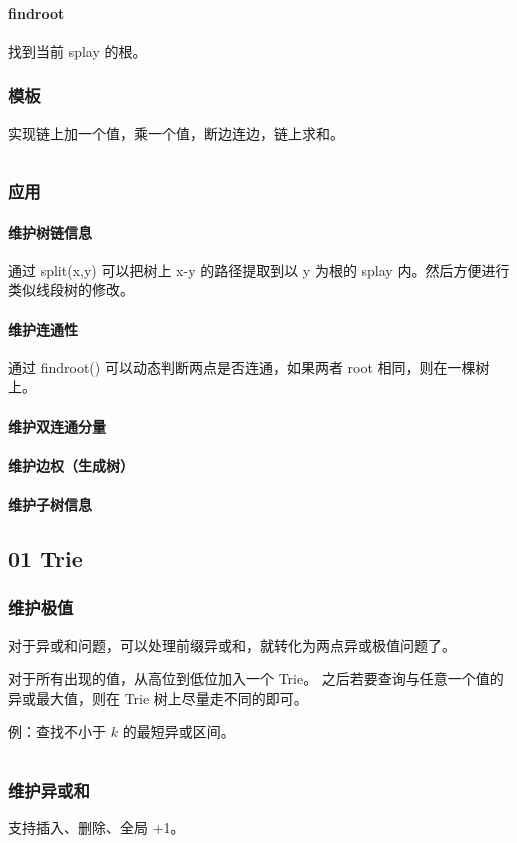 \documentclass[a4paper,11pt]{article}
\begin{document}
\paragraph{findroot}
找到当前 splay 的根。
\subsubsection{模板}
实现链上加一个值，乘一个值，断边连边，链上求和。
\inputminted[linenos]{c++}{structure/lct.cpp}
\subsubsection{应用}
\paragraph{维护树链信息}
通过 split(x,y) 可以把树上 x-y 的路径提取到以 y 为根的 splay 内。然后方便进行类似线段树的修改。
\paragraph{维护连通性}
通过 findroot() 可以动态判断两点是否连通，如果两者 root 相同，则在一棵树上。
\paragraph{维护双连通分量}
\paragraph{维护边权（生成树）}
\paragraph{维护子树信息}

\subsection{01 Trie}
\subsubsection{维护极值}
对于异或和问题，可以处理前缀异或和，就转化为两点异或极值问题了。

对于所有出现的值，从高位到低位加入一个 Trie。
之后若要查询与任意一个值的异或最大值，则在 Trie 树上尽量走不同的即可。

例：查找不小于 $k$ 的最短异或区间。
\inputminted[linenos]{c++}{structure/01triemax.cpp}

\subsubsection{维护异或和}
支持插入、删除、全局 +1。
\end{document}
